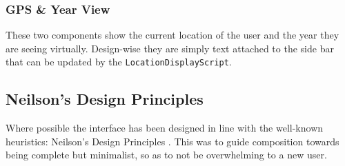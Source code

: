 \documentclass[12pt, a4paper]{article}
\begin{document}
\subsubsection{GPS \& Year View}
These two components show the current location of the user and the year they are seeing virtually. Design-wise they are simply text attached to the side bar that can be updated by the \verb|LocationDisplayScript|. 

\subsection{Neilson's Design Principles}
Where possible the interface has been designed in line with the well-known heuristics: Neilson's Design Principles \cite{design:neilsons}. This was to guide composition towards being complete but minimalist, so as to not be overwhelming to a new user.
\end{document}
